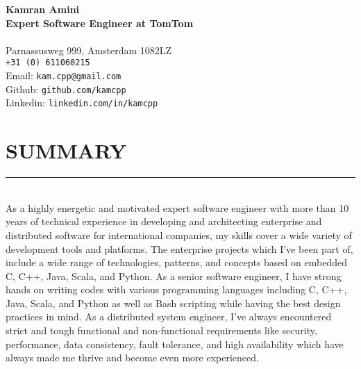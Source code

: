 \documentclass[10pt,a4paper]{article}
\begin{document}
\noindent \textbf{Kamran Amini} \\
\noindent \small \textbf{Expert Software Engineer at TomTom} \\ \\
Parnassusweg 999, Amsterdam 1082LZ \\
\texttt{+31 (0) 611060215} \\
Email: \texttt{kam.cpp@gmail.com} \\
Github: \texttt{github.com/kamcpp} \\
Linkedin: \texttt{linkedin.com/in/kamcpp} 

\section{SUMMARY}
\noindent \rule {18.0cm}{0.2pt} \\
As a highly energetic and motivated expert software engineer with more than 10 years of technical experience in developing and architecting enterprise and distributed software for international companies, my skills cover a wide variety of development tools and platforms. The enterprise projects which I've been part of, include a wide range of technologies, patterns, and concepts based on embedded C, C++, Java, Scala, and Python. As a senior software engineer, I have strong hands on writing codes with various programming languages including C, C++, Java, Scala, and Python as well as Bash scripting while having the best design practices in mind. As a distributed system engineer, I've always encountered strict and tough functional and non-functional requirements like security, performance, data consistency, fault tolerance, and high availability which have always made me thrive and become even more experienced.
\end{document}
